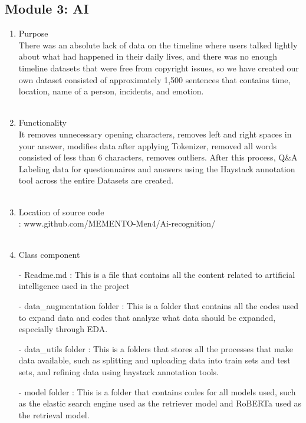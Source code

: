 \documentclass[conference]{IEEEtran}
\begin{document}
\subsection{Module 3: AI}
\begin{enumerate}
    \item Purpose\\
    There was an absolute lack of data on the timeline where users talked lightly about what had happened in their daily lives, and there was no enough timeline datasets that were free from copyright issues, so we have created our own dataset consisted of approximately 1,500 sentences that contains time, location, name of a person, incidents, and emotion.  \\ \\
    \item Functionality\\
    It removes unnecessary opening characters, removes left and right spaces in your answer, modifies data after applying Tokenizer, removed all words consisted of less than 6 characters, removes outliers. After this process, Q\&A Labeling data for questionnaires and answers using the Haystack annotation tool across the entire Datasets are created. \\ \\
    \item Location of source code\\: www.github.com/MEMENTO-Men4/Ai-recognition/ \\ \\
    \item Class component\\
        \item[-] Readme.md : This is a file that contains all the content related to artificial intelligence used in the project
        \item[-] data\_augmentation folder : This is a folder that contains all the codes used to expand data and codes that analyze what data should be expanded, especially through EDA.\\
        \item[-] data\_utils folder : This is a folders that stores all the processes that make data available, such as splitting and uploading data into train sets and test sets, and refining data using haystack annotation tools.\\
        \item[-] model folder : This is a folder that contains codes for all models used, such as the elastic search engine used as the retriever model and RoBERTa used as the retrieval model.\\

\end{enumerate}
\end{document}
